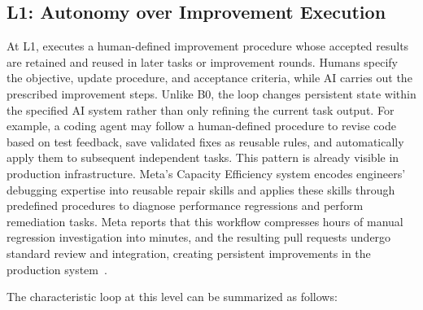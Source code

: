 \subsection{L1: Autonomy over Improvement Execution}
\label{sec:l1-improvement-execution}

At L1, \AISystem{} executes a human-defined improvement procedure whose accepted
results are retained and reused in later tasks or improvement rounds. Humans specify the objective, update procedure, and acceptance criteria, while AI carries out the prescribed improvement steps. Unlike B0, the loop changes persistent state within the specified AI system rather than only refining the current task output. For example, a coding agent may follow a human-defined procedure to revise code based on test feedback, save validated fixes as reusable rules, and automatically apply them to subsequent independent tasks. This pattern is already visible in production infrastructure. Meta's Capacity Efficiency system encodes engineers' debugging expertise into reusable repair skills and applies these skills through predefined procedures to diagnose performance regressions and perform remediation tasks. Meta reports that this workflow compresses hours of manual regression investigation into minutes, and the resulting pull requests undergo standard review and integration, creating persistent improvements in the production system~\cite{meta_capacity_efficiency_2026}.

The characteristic loop at this level can be summarized as follows:

\begin{center}
\end{center}

